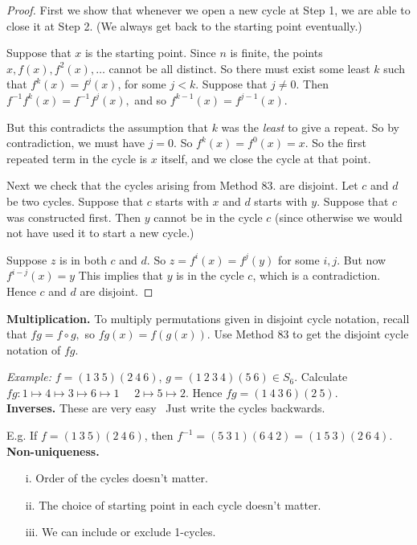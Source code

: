 \documentclass[10pt]{scrartcl}
\begin{document}
\begin{proof}
	First we show that whenever we open a new cycle at Step 1, we are able to close it at Step 2. (We always get back to the starting point eventually.)
	
	Suppose that $x$ is the starting point. Since $n$ is finite, the points $x, f(x), f^2(x),\dots$ cannot be all distinct. So there must exist some least $k$ such that $f^k(x) = f^j(x)$, for some $j < k$. Suppose that $j \neq 0$. Then $f^{-1}f^k(x) = f^{-1}f^j(x),$ and so $f^{k-1}(x) = f^{j-1}(x)$.
	
	 But this contradicts the assumption that $k$ was the \emph{least} to give a repeat. So by contradiction, we must have $j = 0$. So $f^k(x) = f^0(x) = x$. So the first repeated term in the cycle is $x$ itself, and we close the cycle at that point.
	 
	 Next we check that the cycles arising from Method 83. are disjoint. Let $c$ and $d$ be two cycles. Suppose that $c$ starts with $x$ and $d$ starts with $y$. Suppose that $c$ was constructed first. Then $y$ cannot be in the cycle $c$ (since otherwise we would not have used it to start a new cycle.)
	 
	 Suppose $z$ is in both $c$ and $d$. So $z = f^i(x) = f^j(y)$ for some $i,j$. But now $f^{i-j}(x) = y$ This implies that $y$ is in the cycle $c$, which is a contradiction. Hence $c$ and $d$ are disjoint.
\end{proof}\vspace*{5pt}


\noindent \textbf{Multiplication.} To multiply permutations given in disjoint cycle notation, recall that $fg = f \circ g,$ so $fg(x) = f(g(x))$. Use Method 83 to get the disjoint cycle notation of $fg$. 

\textit{Example:} $f = (1~3~5)(2~4~6)$, $g = (1~2~3~4)(5~6) \in S_6$. Calculate $fg: 1 \mapsto 4 \mapsto 3 \mapsto 6 \mapsto 1\quad $ $2\mapsto 5 \mapsto 2$. Hence $fg = (1~4~3~6)(2~5)$.\\
 
 
 \noindent \textbf{Inverses.} These are very easy~ Just write the cycles backwards.
 
E.g. If $f = (1~3~5)(2~4~6)$, then $f^{-1} = (5~3~1)(6~4~2) = (1~5~3)(2~6~4)$.\\
  
 \noindent \textbf{Non-uniqueness.} \begin{enumerate}
 \item[i.] Order of the cycles doesn't matter.	
 \item[ii.] The choice of starting point in each cycle doesn't matter.
 \item[iii.] We can include or exclude 1-cycles.
 \end{enumerate}\vspace*{5pt}
 
\end{document}
